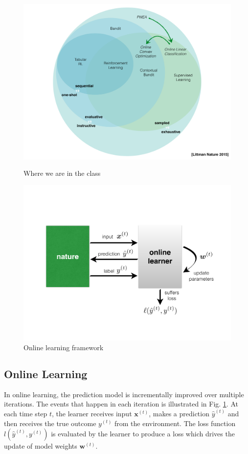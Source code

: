 \documentclass[11pt]{article}
\begin{document}
\begin{figure}[h]
\centering
\begin{minipage}[t]{.5\textwidth}
    \centering
    \includegraphics[width=.99\linewidth]{figure/where_we_are.pdf}
    \caption{Where we are in the class}
    \label{fig:where_we_are}
\end{minipage}%
\begin{minipage}[t]{.5\textwidth}
    \centering
    \includegraphics[width=.90\linewidth]{figure/online_learning.pdf}
    \caption{Online learning framework}
    \label{fig:online_learning}
\end{minipage}
\end{figure}

\subsection{Online Learning}
In online learning, the prediction model is incrementally improved over multiple iterations. The events that happen in each iteration is illustrated in Fig. \ref{fig:online_learning}. At each time step $t$, the learner receives input $\bm{x}^{(t)}$, makes a prediction $\hat{y}^{(t)}$ and then receives the true outcome $y^{(t)}$ from the environment. The loss function $l(\hat{y}^{(t)}, y^{(t)})$ is evaluated by the learner to produce a loss which drives the update of model weights $\bm{w}^{(t)}$.
\end{document}
